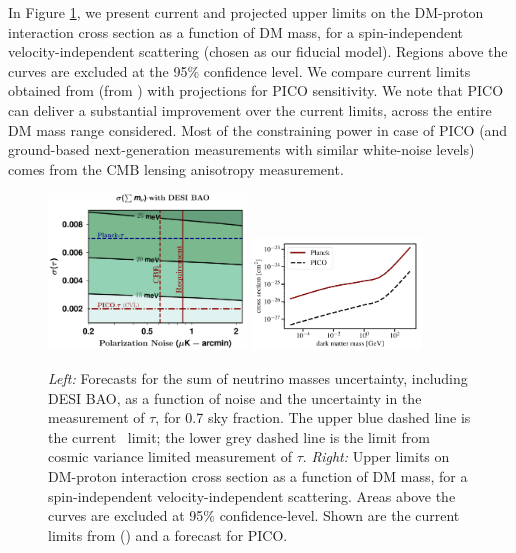\documentclass[PICOReport.tex]{subfiles}
\begin{document}
In Figure \ref{fig:DM_baryons}, we present current and projected upper limits on the DM-proton interaction cross section as a function of DM mass, for a spin-independent velocity-independent scattering (chosen as our fiducial model). Regions above the curves are excluded at the 95$\%$ confidence level. We compare current limits obtained from {\planck} (from \cite{2018PhRvL.121h1301G}) with projections for PICO sensitivity.  We note that PICO can deliver a substantial improvement over the current limits, across the entire DM mass range considered.  Most of the constraining power in case of PICO (and ground-based next-generation measurements with similar white-noise levels) comes from the CMB lensing anisotropy measurement. 


\begin{figure}[t]
\begin{center}
\includegraphics[width=0.47\textwidth]{images/Mnu_tauprior_final.pdf}
\includegraphics[width=0.4\textwidth]{images/pico_dm_baryon.pdf}
\caption{\textit{Left:}  Forecasts for the sum of 
neutrino masses uncertainty, including DESI BAO, as a function of noise and the uncertainty in the measurement of $\tau$, 
for 0.7 sky fraction.  The upper blue dashed line is the current \planck~limit; the lower grey dashed line is the limit from cosmic variance 
limited measurement of $\tau$. \textit{Right:} Upper limits on DM-proton interaction cross section as a function of DM mass, for a spin-independent velocity-independent scattering. Areas above the curves are excluded at 95$\%$ confidence-level.
Shown are the current limits from \planck (\cite{2018PhRvL.121h1301G}) and a forecast for PICO.}\label{fig:DM_baryons}
\end{center}
\end{figure}
\end{document}
